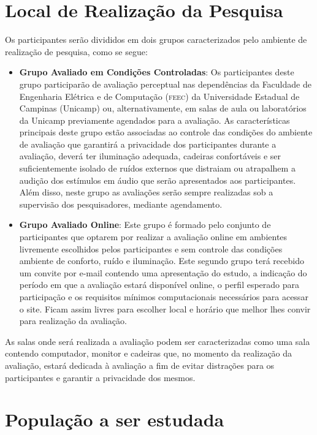 \documentclass[a4paper,11pt,titlepage,singlespacing]{article}
\begin{document}
\section{Local de Realização da Pesquisa}

\noindent Os participantes serão divididos em dois grupos caracterizados pelo ambiente de realização de pesquisa, como se segue:

\begin{itemize}
    \item \textbf{Grupo Avaliado em Condições Controladas}: Os participantes deste grupo participarão de avaliação perceptual nas dependências da Faculdade de Engenharia Elétrica e de Computação (\textsc{feec}) da Universidade Estadual de Campinas (Unicamp) ou, alternativamente, em salas de aula ou laboratórios da Unicamp previamente agendados para a avaliação. As características principais deste grupo estão associadas ao controle das condições do ambiente de avaliação que garantirá a privacidade dos participantes durante a avaliação, deverá ter iluminação adequada, cadeiras confortáveis e ser suficientemente isolado de ruídos externos que distraiam ou atrapalhem a audição dos estímulos em áudio que serão apresentados aos participantes. Além disso, neste grupo as avaliações serão sempre realizadas sob a supervisão dos pesquisadores, mediante agendamento. 
    \item \textbf{Grupo Avaliado Online}: Este grupo é formado pelo conjunto de participantes que optarem por realizar a avaliação online em ambientes livremente escolhidos pelos participantes e sem controle das condições ambiente de conforto, ruído e iluminação. Este segundo grupo terá recebido um convite por e-mail contendo uma apresentação do estudo, a indicação do período em que a avaliação estará disponível online, o perfil esperado para participação e os requisitos mínimos computacionais necessários para acessar o site. Ficam assim livres para escolher local e horário que melhor lhes convir para realização da avaliação.
\end{itemize}

\noindent As salas onde será realizada a avaliação podem ser caracterizadas como uma sala contendo computador, monitor e cadeiras que, no momento da realização da avaliação, estará dedicada à avaliação a fim de evitar distrações para os participantes e garantir a privacidade dos mesmos.

\section{População a ser estudada}
\end{document}
